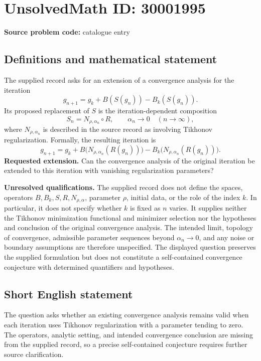 \documentclass[11pt]{article}
\begin{document}
\section*{UnsolvedMath ID: 30001995}
\textbf{Source problem code:} catalogue entry
\subsection{Definitions and mathematical statement}
The supplied record asks for an extension of a convergence analysis for the iteration
\[
g_{n+1}=g_k+B(S(g_n))-B_k(S(g_n)).
\]
Its proposed replacement of \(S\) is the iteration-dependent composition
\[
S_n=N_{\rho,\alpha_n}\circ R,
\qquad \alpha_n\longrightarrow 0\quad(n\to\infty),
\]
where \(N_{\rho,\alpha_n}\) is described in the source record as involving Tikhonov regularization. Formally, the resulting iteration is
\[
g_{n+1}=g_k+B\bigl(N_{\rho,\alpha_n}(R(g_n))\bigr)
             -B_k\bigl(N_{\rho,\alpha_n}(R(g_n))\bigr).
\]
\textbf{Requested extension.} Can the convergence analysis of the original iteration be extended to this iteration with vanishing regularization parameters?

\textbf{Unresolved qualifications.} The supplied record does not define the spaces, operators \(B,B_k,S,R,N_{\rho,\alpha}\), parameter \(\rho\), initial data, or the role of the index \(k\). In particular, it does not specify whether \(k\) is fixed as \(n\) varies. It supplies neither the Tikhonov minimization functional and minimizer selection nor the hypotheses and conclusion of the original convergence analysis. The intended limit, topology of convergence, admissible parameter sequences beyond \(\alpha_n\to0\), and any noise or boundary assumptions are therefore unspecified. The displayed question preserves the supplied formulation but does not constitute a self-contained convergence conjecture with determined quantifiers and hypotheses.
\subsection{Short English statement}
The question asks whether an existing convergence analysis remains valid when each iteration uses Tikhonov regularization with a parameter tending to zero. The operators, analytic setting, and intended convergence conclusion are missing from the supplied record, so a precise self-contained conjecture requires further source clarification.
\end{document}
